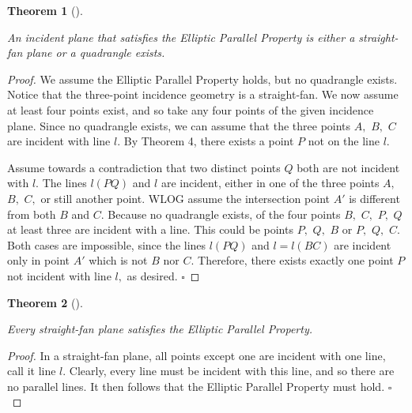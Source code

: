\documentclass[
  twoside,
  12pt,
  letterpaper,
  fleqn]{article}
\theoremstyle{definition}
\theoremstyle{definition}
\theoremstyle{plain}
\theoremstyle{plain}
\newtheorem{theorem}{Theorem}[section]
\theoremstyle{remark}
\begin{document}
\begin{theorem}[]\protect\hypertarget{thm-straight-fan-quadrilateral}{}\label{thm-straight-fan-quadrilateral}

An incident plane that satisfies the Elliptic Parallel Property is
either a straight-fan plane or a quadrangle exists.

\end{theorem}

\begin{proof}

We assume the Elliptic Parallel Property holds, but no quadrangle
exists. Notice that the three-point incidence geometry is a
straight-fan. We now assume at least four points exist, and so take any
four points of the given incidence plane. Since no quadrangle exists, we
can assume that the three points \(A,\) \(B,\) \(C\) are incident with
line \(l.\) By Theorem 4, there exists a point \(P\) not on the line
\(l.\)

Assume towards a contradiction that two distinct points \(Q\) both are
not incident with \(l.\) The lines \(l(PQ)\) and \(l\) are incident,
either in one of the three points \(A,\) \(B,\) \(C,\) or still another
point. WLOG assume the intersection point \(A'\) is different from both
\(B\) and \(C.\) Because no quadrangle exists, of the four points \(B,\)
\(C,\) \(P,\) \(Q\) at least three are incident with a line. This could
be points \(P,\) \(Q,\) \(B\) or \(P,\) \(Q,\) \(C.\) Both cases are
impossible, since the lines \(l(PQ)\) and \(l =l(BC)\) are incident only
in point \(A'\) which is not \(B\) nor \(C.\) Therefore, there exists
exactly one point \(P\) not incident with line \(l,\) as desired.
\(\square\)

\end{proof}

\begin{theorem}[]\protect\hypertarget{thm-straight-fan-plane}{}\label{thm-straight-fan-plane}

Every straight-fan plane satisfies the Elliptic Parallel Property.

\end{theorem}

\begin{proof}

In a straight-fan plane, all points except one are incident with one
line, call it line \(l.\) Clearly, every line must be incident with this
line, and so there are no parallel lines. It then follows that the
Elliptic Parallel Property must hold. \(\square\)

\end{proof}
\end{document}
